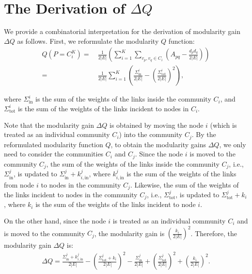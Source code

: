\section{The Derivation of $\Delta Q$}
\label{sec: Derivation of delta Q}

We provide a combinatorial interpretation for the derivation of modularity gain $\Delta Q$ as follows. First, we reformulate the modularity $Q$ function:
\begin{align}
Q(P = C_i^K) = 
&\ \frac{1}{2|E|} \left( \sum_{i=1}^{K} \sum_{v_p, v_q \in C_i} \left( A_{pq} - \frac{d_p d_q}{2|E|} \right) \right) \nonumber \\
= 
&\ \frac{1}{2|E|} \sum_{i=1}^{K} \left( \frac{\Sigma_{\text{in}}^i}{2|E|} - \left( \frac{\Sigma_{\text{tot}}^i}{2|E|} \right)^2 \right),
\end{align}

\noindent where $\Sigma_{\text{in}}^i$ is the sum of the weights of the links inside the community $C_i$, and $\Sigma_{\text{tot}}^i$ is the sum of the weights of the links incident to nodes in $C_i$.

Note that the modularity gain $\Delta Q$ is obtained by moving the node $i$ (which is treated as an individual community $C_i$) into the community $C_j$. By the reformulated modularity function $Q$, to obtain the modularity gains $\Delta Q$, we only need to consider the communities $C_i$ and $C_j$. Since the node $i$ is moved to the community $C_j$, the sum of the weights of the links inside the community $C_j$, i.e., $\Sigma_{\text{in}}^j$, is updated to $\Sigma_{\text{in}}^j + k_{i, \text{in}}^j$, where $k_{i, \text{in}}^j$ is the sum of the weights of the links from node $i$ to nodes in the community $C_j$. Likewise, the sum of the weights of the links incident to nodes in the community $C_j$, i.e., $\Sigma_{\text{tot}}^j$, is updated to $\Sigma_{\text{tot}}^j + k_i$, where $k_i$ is the sum of the weights of the links incident to node $i$.

On the other hand, since the node $i$ is treated as an individual community $C_i$ and is moved to the community $C_j$, the modularity gain is $\left( \frac{k_i}{2|E|} \right)^2$. Therefore, the modularity gain $\Delta Q$ is:
\begin{align}
\Delta Q = 
\frac{\Sigma_{\text{in}}^j + k_{i, \text{in}}^j}{2|E|} 
- \left( \frac{\Sigma_{\text{tot}}^j + k_i}{2|E|} \right)^2 - \frac{\Sigma_{\text{in}}^j}{2|E|} 
+ \left( \frac{\Sigma_{\text{tot}}^j}{2|E|} \right)^2 
+ \left( \frac{k_i}{2|E|} \right)^2.
\end{align}


